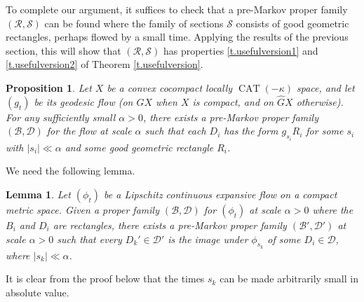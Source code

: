 \documentclass[10pt]{amsart}
\let\mathcal\mathscr
\newtheorem{lem}[thm]{Lemma}
\newtheorem{prop}[thm]{Proposition}
\theoremstyle{definition}
\numberwithin{equation}{section}
\DeclareMathOperator{\CAT}{CAT}
\newcommand\DDD{\mathcal D}
\newcommand\BBB{\mathcal B}
\newcommand\RRR{\mathcal R}
\newcommand\SSS{\mathcal S}
\begin{document}
To complete our argument, it suffices to check that a pre-Markov proper family $(\RRR, \SSS)$ can be found where the family of sections $\SSS$ consists of good geometric rectangles, perhaps flowed by a small time. Applying the results of the previous section, this will show that $(\RRR, \SSS)$ has properties \eqref{t.usefulversion1} and \eqref{t.usefulversion2} of Theorem \ref{t.usefulversion}.

\begin{prop}\label{prop:good mpf}
Let $X$ be a convex cocompact locally $\CAT(-\kappa)$ space, and let $(g_t)$ be its geodesic flow (on $GX$ when $X$ is compact, and on $\hat GX$ otherwise). For any sufficiently small $\alpha>0$, there exists a pre-Markov proper family $(\BBB, \DDD)$ for the flow at scale $\alpha$ such that each $D_i$ has the form $g_{s_i}R_i$ for some $s_i$ with $|s_i| \ll  \alpha$ and some good geometric rectangle $R_i$.
\end{prop}

We need the following lemma.

\begin{lem} \label{markovpf}
Let $(\phi_t)$ be a Lipschitz continuous expansive flow on a compact metric space. Given a proper family $(\BBB, \DDD)$ for $(\phi_t)$ at scale $\alpha>0$ where the $B_i$ and $D_i$ are rectangles, there exists a pre-Markov proper family $(\BBB', \DDD')$ at scale $\alpha>0$ such that every $D_k'\in\mathcal{D}'$ is the image under $\phi_{s_k}$ of some $D_i\in\mathcal{D}$, where $|s_k| \ll  \alpha$.
\end{lem}

It is clear from the proof below that the times $s_k$ can be made arbitrarily small in absolute value.
\end{document}
